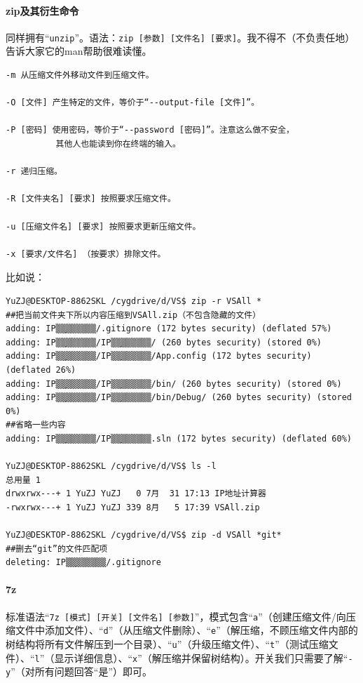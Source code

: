 \paragraph{zip及其衍生命令}
同样拥有“\verb|unzip|”。语法：\verb|zip [参数] [文件名] [要求]|。我不得不（不负责任地）告诉大家它的man帮助很难读懂。\par
\begin{verbatim}
-m 从压缩文件外移动文件到压缩文件。

-O [文件] 产生特定的文件，等价于“--output-file [文件]”。

-P [密码] 使用密码，等价于“--password [密码]”。注意这么做不安全，
          其他人也能读到你在终端的输入。

-r 递归压缩。

-R [文件夹名] [要求] 按照要求压缩文件。

-u [压缩文件名] [要求] 按照要求更新压缩文件。

-x [要求/文件名] （按要求）排除文件。
\end{verbatim}\par
比如说：\par
\begin{verbatim}
YuZJ@DESKTOP-8862SKL /cygdrive/d/VS$ zip -r VSAll *
##把当前文件夹下所以内容压缩到VSAll.zip（不包含隐藏的文件）
adding: IP▒▒ַ▒▒▒▒▒▒/.gitignore (172 bytes security) (deflated 57%)
adding: IP▒▒ַ▒▒▒▒▒▒/IP▒▒ַ▒▒▒▒▒▒/ (260 bytes security) (stored 0%)
adding: IP▒▒ַ▒▒▒▒▒▒/IP▒▒ַ▒▒▒▒▒▒/App.config (172 bytes security) (deflated 26%)
adding: IP▒▒ַ▒▒▒▒▒▒/IP▒▒ַ▒▒▒▒▒▒/bin/ (260 bytes security) (stored 0%)
adding: IP▒▒ַ▒▒▒▒▒▒/IP▒▒ַ▒▒▒▒▒▒/bin/Debug/ (260 bytes security) (stored 0%)
##省略一些内容
adding: IP▒▒ַ▒▒▒▒▒▒/IP▒▒ַ▒▒▒▒▒▒.sln (172 bytes security) (deflated 60%)

YuZJ@DESKTOP-8862SKL /cygdrive/d/VS$ ls -l
总用量 1
drwxrwx---+ 1 YuZJ YuZJ   0 7月  31 17:13 IP地址计算器
-rwxrwx---+ 1 YuZJ YuZJ 339 8月   5 17:39 VSAll.zip

YuZJ@DESKTOP-8862SKL /cygdrive/d/VS$ zip -d VSAll *git*
##删去“git”的文件匹配项
deleting: IP▒▒ַ▒▒▒▒▒▒/.gitignore
\end{verbatim}
\paragraph{7z}
标准语法“\verb|7z [模式] [开关] [文件名] [参数]|”，模式包含“\verb|a|”（创建压缩文件/向压缩文件中添加文件）、“\verb|d|”（从压缩文件删除）、“\verb|e|”（解压缩，不顾压缩文件内部的树结构将所有文件解压到一个目录）、“\verb|u|”（升级压缩文件）、“\verb|t|”（测试压缩文件）、“\verb|l|”（显示详细信息）、“\verb|x|”（解压缩并保留树结构）。开关我们只需要了解“\verb|-y|”（对所有问题回答“是”）即可。
